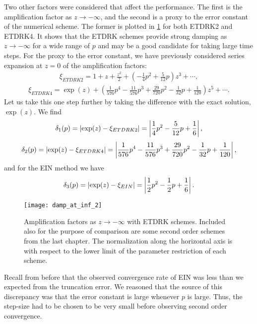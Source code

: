 Two other factors were considered that affect the performance. The first is the amplification factor as $z\to-\infty$, and the second is a proxy to the error constant of the numerical scheme. The former is plotted in \cref{fig:damp fac at inf etd} for both ETDRK2 and ETDRK4. It shows that the ETDRK schemes provide strong damping as $z\to-\infty$ for a wide range of $p$ and may be a good candidate for taking large time steps. For the proxy to the error constant, we have previously considered series expansion at $z=0$ of the amplification factors:
\begin{align}
        \xi_{ETDRK2} = 1+ z + \frac{z^2}{2} + \left(-\frac{1}{4}p^2 + \frac{5}{12}p \right) z^3 + \cdots ,
\end{align}
\begin{align}
        \xi_{ETDRK4} = \exp(z) + \left( 
\frac{1}{576}p^4 
- \frac{11}{576}p^3
+ \frac{29}{720}p^2
- \frac{1}{32}p
+ \frac{1}{120} 
\right) z^5 + \cdots .
\end{align}
Let us take this one step further by taking the difference with the exact solution, $\exp(z)$. We find 
\begin{align}
        \delta_1(p) = \left|\exp(z) - \xi_{ETDRK2}\right| 
= \left|\frac{1}{4}p^2 - \frac{5}{12}p + \frac{1}{6}\right|,
\end{align}
\begin{align}
        \delta_2(p) = \left|\exp(z) - \xi_{ETDRK4}\right| 
= \left|\frac{1}{576}p^4 
- \frac{11}{576}p^3
+ \frac{29}{720}p^2
- \frac{1}{32}p
+ \frac{1}{120} \right|,
\end{align}
and for the EIN method we have 
\begin{align}
\delta_3(p) = \left|\exp(z) - \xi_{EIN}\right| 
= \left|\frac{1}{2} p^2 - \frac{1}{2}p + \frac{1}{6}\right|.
\end{align}

\begin{figure}[htb!]
        \centering
\texttt{[image: damp\_at\_inf\_2]}
\caption[Amplification factors as $z\to-\infty$]{Amplification factors as $z\to-\infty$ with ETDRK schemes. Included also for the purpose of comparison are some second order schemes from the last chapter. The normalization along the horizontal axis is with respect to the lower limit of the parameter restriction of each scheme.}
\label{fig:damp fac at inf etd}
\end{figure}

Recall from before that the observed convergence rate of EIN was less than we expected from the truncation error. We reasoned that the source of this discrepancy was that the error constant is large whenever $p$ is large. Thus, the step-size had to be chosen to be very small before observing second order convergence.

